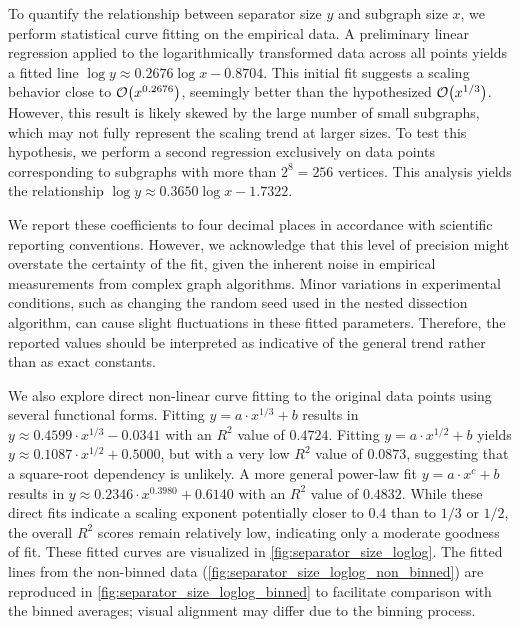 To quantify the relationship between separator size \( y \) and subgraph size \( x \), we perform statistical curve fitting on the empirical data.
A preliminary linear regression applied to the logarithmically transformed data across all points yields a fitted line \( \log y \approx 0.2676 \log x - 0.8704 \).
This initial fit suggests a scaling behavior close to \( \mathcal{O}\!\left(x^{0.2676}\right) \), seemingly better than the hypothesized \( \mathcal{O}\!\left(x^{1/3}\right) \).
However, this result is likely skewed by the large number of small subgraphs, which may not fully represent the scaling trend at larger sizes.
To test this hypothesis, we perform a second regression exclusively on data points corresponding to subgraphs with more than \( 2^8 = 256 \) vertices.
This analysis yields the relationship \( \log y \approx 0.3650 \log x - 1.7322 \).

We report these coefficients to four decimal places in accordance with scientific reporting conventions.
However, we acknowledge that this level of precision might overstate the certainty of the fit, given the inherent noise in empirical measurements from complex graph algorithms.
Minor variations in experimental conditions, such as changing the random seed used in the nested dissection algorithm, can cause slight fluctuations in these fitted parameters.
Therefore, the reported values should be interpreted as indicative of the general trend rather than as exact constants.

We also explore direct non-linear curve fitting to the original data points using several functional forms.
Fitting \( y = a \cdot x^{1/3} + b \) results in \( y \approx 0.4599 \cdot x^{1/3} - 0.0341 \) with an \( R^2 \) value of \( 0.4724 \).
Fitting \( y = a \cdot x^{1/2} + b \) yields \( y \approx 0.1087 \cdot x^{1/2} + 0.5000 \), but with a very low \( R^2 \) value of \( 0.0873 \), suggesting that a square-root dependency is unlikely.
A more general power-law fit \( y = a \cdot x^c + b \) results in \( y \approx 0.2346 \cdot x^{0.3980} + 0.6140 \) with an \( R^2 \) value of \( 0.4832 \).
While these direct fits indicate a scaling exponent potentially closer to \( 0.4 \) than to \( 1/3 \) or \( 1/2 \), the overall \( R^2 \) scores remain relatively low, indicating only a moderate goodness of fit.
These fitted curves are visualized in \cref{fig:separator_size_loglog}.
The fitted lines from the non-binned data (\cref{fig:separator_size_loglog_non_binned}) are reproduced in \cref{fig:separator_size_loglog_binned} to facilitate comparison with the binned averages; visual alignment may differ due to the binning process.

